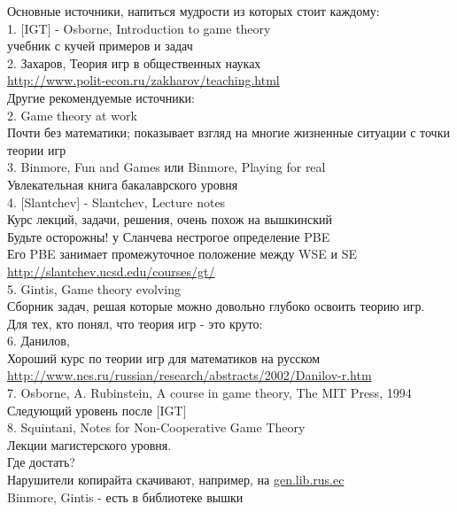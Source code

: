 \documentclass[pdftex,12pt,a4paper]{article}
\begin{document}
\newpage

Основные источники, напиться мудрости из которых стоит каждому:\\
1. $[$IGT$]$ - Osborne, Introduction to game theory \\
учебник с кучей примеров и задач \\
2. Захаров, Теория игр в общественных науках \\
\url{http://www.polit-econ.ru/zakharov/teaching.html} \\

Другие рекомендуемые источники: \\
2. Game theory at work \\
Почти без математики; показывает взгляд на многие жизненные ситуации с точки теории игр\\
3. Binmore, Fun and Games или Binmore, Playing for real \\
Увлекательная книга бакалаврского уровня \\
4. $[$Slantchev$]$ - Slantchev, Lecture notes \\
Курс лекций, задачи, решения, очень похож на вышкинский \\
Будьте осторожны! у Сланчева нестрогое определение PBE \\
Его PBE занимает промежуточное положение между WSE и SE \\
\url{http://slantchev.ucsd.edu/courses/gt/} \\
5. Gintis, Game theory evolving \\
Сборник задач, решая которые можно довольно глубоко освоить теорию игр. \\

Для тех, кто понял, что теория игр - это круто: \\
6. Данилов, \\
Хороший курс по теории игр для математиков на русском \\
\url{http://www.nes.ru/russian/research/abstracts/2002/Danilov-r.htm} \\

7. Osborne, A. Rubinstein, A course in game theory, The MIT Press, 1994 \\
Следующий уровень после $[$IGT$]$ \\
8. Squintani, Notes for Non-Cooperative Game Theory \\
Лекции магистерского уровня. \\

Где достать? \\
Нарушители копирайта скачивают, например, на \url{gen.lib.rus.ec} \\
Binmore, Gintis - есть в библиотеке вышки \\ \\
\end{document}
